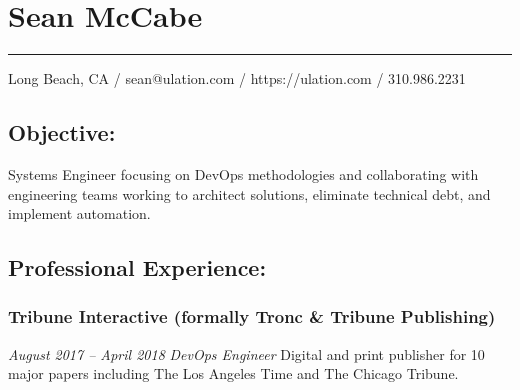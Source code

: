\documentclass[]{article}
\date{}
\begin{document}
\hypertarget{sean-mccabe}{%
\section{Sean McCabe}\label{sean-mccabe}}

\begin{center}\rule{0.5\linewidth}{\linethickness}\end{center}

Long Beach, CA / sean@ulation.com / https://ulation.com / 310.986.2231

\hypertarget{objective}{%
\subsection{Objective:}\label{objective}}

Systems Engineer focusing on DevOps methodologies and collaborating with
engineering teams working to architect solutions, eliminate technical
debt, and implement automation.

\hypertarget{professional-experience}{%
\subsection{Professional Experience:}\label{professional-experience}}

\hypertarget{tribune-interactive-formally-tronc-tribune-publishing}{%
\subsubsection{Tribune Interactive (formally Tronc \& Tribune
Publishing)}\label{tribune-interactive-formally-tronc-tribune-publishing}}

\emph{August 2017 -- April 2018} \emph{DevOps Engineer} Digital and
print publisher for 10 major papers including The Los Angeles Time and
The Chicago Tribune.
\end{document}
